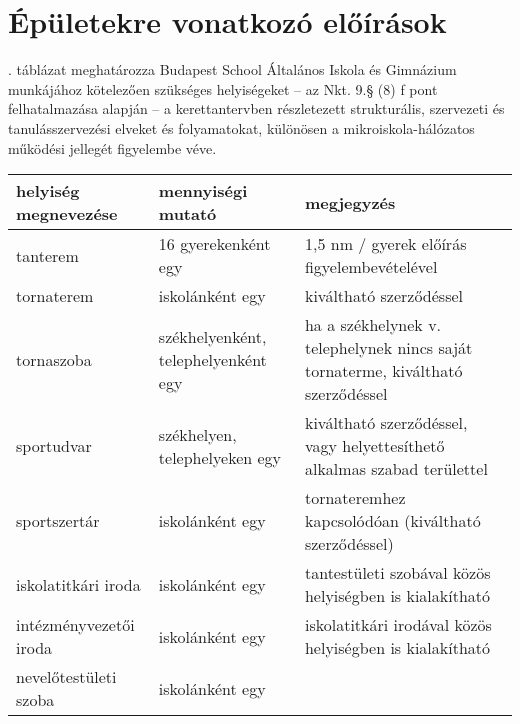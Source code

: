 \section{Épületekre vonatkozó előírások}
. táblázat meghatározza Budapest School Általános Iskola és Gimnázium munkájához kötelezően szükséges helyiségeket -- az Nkt. 9.§ (8) f pont felhatalmazása alapján -- a kerettantervben részletezett strukturális, szervezeti és tanulásszervezési elveket és folyamatokat, különösen a mikroiskola-hálózatos működési jellegét figyelembe véve.


\begin{longtable}{@{}p{4cm}|p{4cm}|p{6cm}@{}}

\textbf{helyiség megnevezése}   & \textbf{mennyiségi mutató}                       & \textbf{megjegyzés}                                                                                      \\ \hline
tanterem               & 16 gyerekenként egy                       & 1,5 nm / gyerek előírás figyelembevételével                                                    \\ \hline
tornaterem             & iskolánként egy                           & kiváltható szerződéssel                                                                         \\ \hline
tornaszoba             & székhelyenként, telephelyenként egy       & ha a székhelynek v. telephelynek nincs saját tornaterme, kiváltható szerződéssel                                            \\ \hline
sportudvar             & székhelyen, telephelyeken egy             & kiváltható szerződéssel, vagy helyettesíthető alkalmas szabad területtel                        \\ \hline
sportszertár           & iskolánként egy                           & tornateremhez kapcsolódóan (kiváltható szerződéssel)                                            \\ \hline
iskolatitkári iroda    & iskolánként egy                           & tantestületi szobával közös helyiségben  is kialakítható                                        \\ \hline
intézményvezetői iroda & iskolánként egy                           & iskolatitkári irodával közös helyiségben is kialakítható                                        \\ \hline
nevelőtestületi szoba  & iskolánként egy                           &                                                                                                 \\ \hline

\end{longtable}
